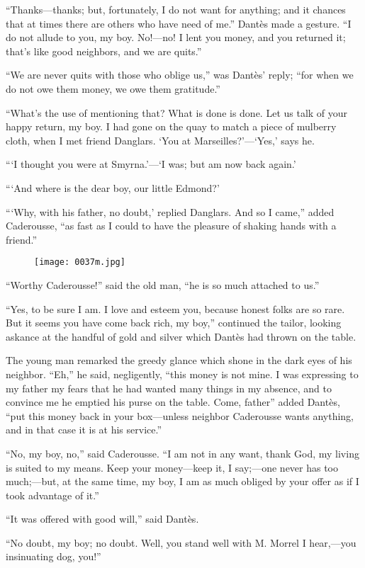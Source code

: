 “Thanks—thanks; but, fortunately, I do not want for anything; and it
chances that at times there are others who have need of me.” Dantès
made a gesture. “I do not allude to you, my boy. No!—no! I lent you
money, and you returned it; that’s like good neighbors, and we are
quits.”

“We are never quits with those who oblige us,” was Dantès’ reply; “for
when we do not owe them money, we owe them gratitude.”

“What’s the use of mentioning that? What is done is done. Let us talk
of your happy return, my boy. I had gone on the quay to match a piece
of mulberry cloth, when I met friend Danglars. ‘You at
Marseilles?’—‘Yes,’ says he.

“‘I thought you were at Smyrna.’—‘I was; but am now back again.’

“‘And where is the dear boy, our little Edmond?’

“‘Why, with his father, no doubt,’ replied Danglars. And so I came,”
added Caderousse, “as fast as I could to have the pleasure of shaking
hands with a friend.”

\begin{figure}[h]
\texttt{[image: 0037m.jpg]}
\end{figure}

“Worthy Caderousse!” said the old man, “he is so much attached to us.”

“Yes, to be sure I am. I love and esteem you, because honest folks are
so rare. But it seems you have come back rich, my boy,” continued the
tailor, looking askance at the handful of gold and silver which Dantès
had thrown on the table.

The young man remarked the greedy glance which shone in the dark eyes
of his neighbor. “Eh,” he said, negligently, “this money is not mine. I
was expressing to my father my fears that he had wanted many things in
my absence, and to convince me he emptied his purse on the table. Come,
father” added Dantès, “put this money back in your box—unless neighbor
Caderousse wants anything, and in that case it is at his service.”

“No, my boy, no,” said Caderousse. “I am not in any want, thank God, my
living is suited to my means. Keep your money—keep it, I say;—one never
has too much;—but, at the same time, my boy, I am as much obliged by
your offer as if I took advantage of it.”

“It was offered with good will,” said Dantès.

“No doubt, my boy; no doubt. Well, you stand well with M. Morrel I
hear,—you insinuating dog, you!”

